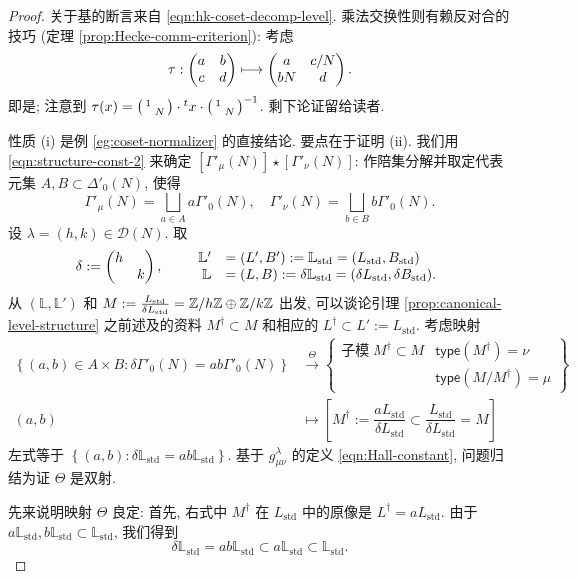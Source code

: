 \begin{proof}
	关于基的断言来自 \eqref{eqn:hk-coset-decomp-level}. 乘法交换性则有赖反对合的技巧 (定理 \ref{prop:Hecke-comm-criterion}): 考虑
	\[ \tau: \begin{pmatrix} a & b \\ c & d \end{pmatrix} \longmapsto \begin{pmatrix} a & c/N \\ bN & d \end{pmatrix}. \]
	即是; 注意到 $\tau(x) = \bigl(\begin{smallmatrix} 1 &  \\  & N \end{smallmatrix}\bigr) \cdot {}^t x \cdot \bigl(\begin{smallmatrix} 1 &  \\  & N \end{smallmatrix}\bigr)^{-1}$. 剩下论证留给读者.

	性质 (i) 是例 \ref{eg:coset-normalizer} 的直接结论. 要点在于证明 (ii). 我们用 \eqref{eqn:structure-const-2} 来确定 $[\Gamma'_\mu(N)] \star [\Gamma'_\nu(N)]$: 作陪集分解并取定代表元集 $A, B \subset \Delta'_0(N)$, 使得
	\[ \Gamma'_\mu(N) = \bigsqcup_{a \in A} a \Gamma'_0(N), \quad \Gamma'_\nu(N) = \bigsqcup_{b \in B} b \Gamma'_0(N). \]
	设 $\lambda = (h,k) \in \mathcal{D}(N)$. 取
	\begin{gather*}
		\delta := \begin{pmatrix} h &  \\  & k \end{pmatrix}, \qquad
		\begin{array}{rl}
			\mathbb{L}' & = (L',B') := \mathbb{L}_{\text{std}} = (L_{\text{std}}, B_{\text{std}}) \\
			\mathbb{L} & = (L,B) := \delta\mathbb{L}_{\text{std}} = (\delta L_{\text{std}}, \delta B_{\text{std}}).
		\end{array}
	\end{gather*}
	从 $(\mathbb{L}, \mathbb{L}')$ 和 $M := \frac{L_{\mathrm{std}}}{\delta L_{\mathrm{std}}} = \mathbb{Z}/h\mathbb{Z} \oplus \mathbb{Z}/k\mathbb{Z}$ 出发, 可以谈论引理 \ref{prop:canonical-level-structure} 之前述及的资料 $M^\dagger \subset M$ 和相应的 $L^\dagger \subset L' := L_{\text{std}}$. 考虑映射
	\begin{align*}
		\left\{ (a,b) \in A \times B: \delta \Gamma'_0(N) = ab\Gamma'_0(N) \right\} & \stackrel{\Theta}{\longrightarrow} \left\{
		\begin{array}{r|l}
			\text{子模}\; M^\dagger \subset M & \mathsf{type}(M^\dagger) = \nu \\
			& \mathsf{type}(M/M^\dagger) = \mu
		\end{array}\right\} \\
		(a,b) & \longmapsto
			\left[
				M^\dagger := \dfrac{a L_{\text{std}}}{\delta L_{\text{std}}} \subset \dfrac{L_{\text{std}}}{\delta L_{\text{std}}} = M
			\right]
	\end{align*}
	左式等于 $\left\{(a,b) : \delta \mathbb{L}_{\text{std}} = ab \mathbb{L}_{\text{std}} \right\}$. 基于 $g^\lambda_{\mu\nu}$ 的定义 \eqref{eqn:Hall-constant}, 问题归结为证 $\Theta$ 是双射.
	
	先来说明映射 $\Theta$ 良定: 首先, 右式中 $M^\dagger$ 在 $L_{\text{std}}$ 中的原像是 $L^\dagger = a L_{\text{std}}$. 由于 $a\mathbb{L}_{\text{std}}, b \mathbb{L}_{\text{std}} \subset \mathbb{L}_{\text{std}}$, 我们得到
	\begin{equation}\label{eqn:delta-ab-bound}
		\delta \mathbb{L}_{\text{std}} = ab\mathbb{L}_{\text{std}} \subset a \mathbb{L}_{\text{std}} \subset \mathbb{L}_{\text{std}}.
	\end{equation}


\end{proof}

